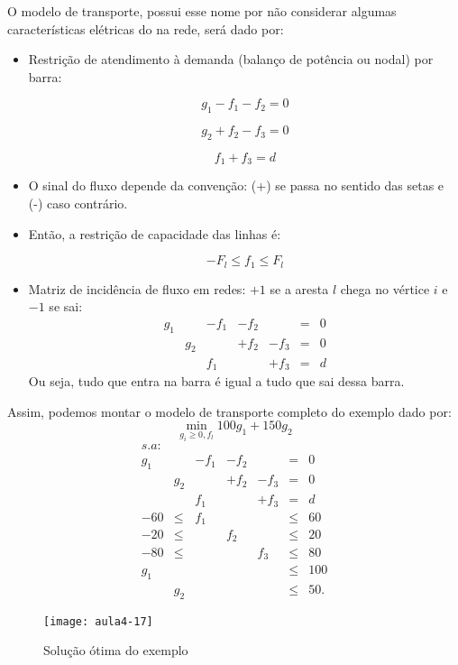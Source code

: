 O modelo de transporte, possui esse nome por não considerar algumas características elétricas do na rede, será dado por:
\begin{itemize}
\item Restrição de atendimento à demanda (balanço de potência ou nodal)
por barra:

\[
g_{1}-f_{1}-f_{2}=0
\]


\[
g_{2}+f_{2}-f_{3}=0
\]


\[
f_{1}+f_{3}=d
\]
\item O sinal do fluxo depende da convenção: (+) se passa no sentido das setas e (-) caso contrário.
\item Então, a restrição de capacidade das linhas é:

\[
-F_{l}\leq f_{1}\leq F_{l}
\]
\item Matriz de incidência de fluxo em redes: $+1$ se a aresta $l$ chega
no vértice $i$ e $-1$ se sai:
\[
\begin{array}{ccccccc}
g_{1} &  & -f_{1} & -f_{2} &  & = & 0\\
 & g_{2} &  & +f_{2} & -f_{3} & = & 0\\
 &  & f_{1} &  & +f_{3} & = & d
\end{array}
\]
Ou seja, tudo que entra na barra é igual a tudo que sai dessa barra.
\end{itemize}
Assim, podemos montar o modelo de transporte completo do exemplo dado por:
\[
\min_{g_{i}\geq0,f_{l}}100g_{1}+150g_{2}
\]
\[
\begin{array}{ccccccc}
s.a:\\
g_{1} &  & -f_{1} & -f_{2} &  & = & 0\\
 & g_{2} &  & +f_{2} & -f_{3} & = & 0\\
 &  & f_{1} &  & +f_{3} & = & d\\
-60 & \leq & f_{1} &  &  & \leq & 60\\
-20 & \leq &  & f_{2} &  & \leq & 20\\
-80 & \leq &  &  & f_{3} & \leq & 80\\
g_{1} &  &  &  &  & \leq & 100\\
 & g_{2} &  &  &  & \leq & 50.
\end{array}
\]
\begin{figure}[H]
\begin{centering}
\texttt{[image: aula4-17]}\protect\caption{\label{fig:aula4-17} Solução ótima do exemplo}
\end{centering}
\end{figure}

